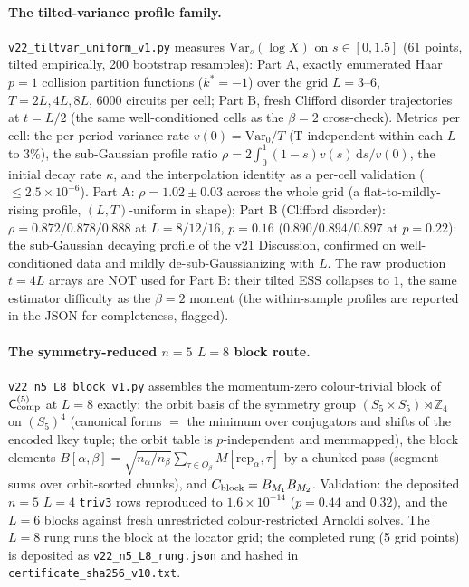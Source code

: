 \documentclass[aps,prx,reprint,superscriptaddress,nobibnotes,longbibliography]{revtex4-2}
\newcommand{\Ccomp}{\mathsf C_{\rm comp}}
\begin{document}
\paragraph{The tilted-variance profile family.}
\texttt{v22\_tiltvar\_uniform\_v1.py} measures
$\mathrm{Var}_s(\log X)$ on $s\in[0,1.5]$ (61 points, tilted empirically, 200
bootstrap resamples): Part A, exactly enumerated Haar $p=1$ collision
partition functions ($k^\ast=-1$) over the grid $L=3$--$6$,
$T=2L,4L,8L$, $6000$ circuits per cell; Part B, fresh Clifford disorder
trajectories at $t=L/2$ (the same well-conditioned cells as the
$\beta=2$ cross-check).  Metrics per cell: the per-period variance rate
$v(0)=\mathrm{Var}_0/T$ (T-independent within each $L$ to $3\%$), the
sub-Gaussian profile ratio $\rho=2\int_0^1(1-s)v(s)\,\mathrm
ds/v(0)$, the initial decay rate $\kappa$, and the interpolation identity
as a per-cell validation ($\le2.5\times10^{-6}$).  Part A:
$\rho=1.02\pm0.03$ across the whole grid (a flat-to-mildly-rising
profile, $(L,T)$-uniform in shape); Part B (Clifford disorder):
$\rho=0.872/0.878/0.888$ at $L=8/12/16$, $p=0.16$ ($0.890/0.894/0.897$
at $p=0.22$): the sub-Gaussian decaying profile of the v21 Discussion,
confirmed on well-conditioned data and mildly de-sub-Gaussianizing with
$L$.  The raw production $t=4L$ arrays are NOT used for
Part B: their tilted ESS collapses to $1$, the same estimator difficulty
as the $\beta=2$ moment (the within-sample profiles are reported in the
JSON for completeness, flagged).

\paragraph{The symmetry-reduced $n=5$ $L=8$ block route.}
\texttt{v22\_n5\_L8\_block\_v1.py} assembles the momentum-zero
colour-trivial block of $\Ccomp^{(5)}$ at $L=8$ exactly: the orbit basis
of the symmetry group $(S_5\times S_5)\rtimes\mathbb Z_4$ on
$(S_5)^4$ (canonical forms $=$ the minimum over conjugators and shifts of
the encoded lkey tuple; the orbit table is $p$-independent and
memmapped), the block elements
$B[\alpha,\beta]=\sqrt{n_\alpha/n_\beta}\sum_{\tau\in O_\beta}
M[\mathrm{rep}_\alpha,\tau]$ by a chunked pass (segment sums over
orbit-sorted chunks), and $C_{\rm block}=B_{M_1}B_{M_2}$.  Validation:
the deposited $n=5$ $L=4$ \texttt{triv3} rows reproduced to
$1.6\times10^{-14}$ ($p=0.44$ and $0.32$), and the $L=6$ blocks against
fresh unrestricted colour-restricted Arnoldi solves.  The $L=8$ rung
runs the block at the locator grid; the completed rung (5 grid
points) is deposited as \texttt{v22\_n5\_L8\_rung.json} and hashed in
\texttt{certificate\_sha256\_v10.txt}.
\end{document}
